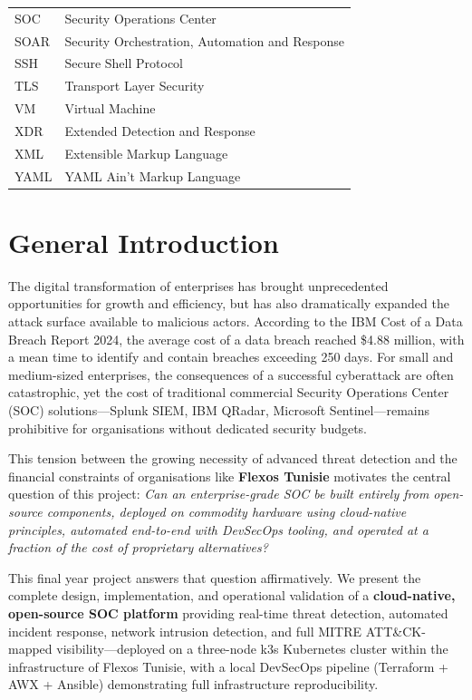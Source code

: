 \documentclass[12pt,a4paper]{report}
\begin{document}
\begin{longtable}{p{3cm}p{10cm}}
SOC    & Security Operations Center \\
SOAR   & Security Orchestration, Automation and Response \\
SSH    & Secure Shell Protocol \\
TLS    & Transport Layer Security \\
VM     & Virtual Machine \\
XDR    & Extended Detection and Response \\
XML    & Extensible Markup Language \\
YAML   & YAML Ain't Markup Language \\
\bottomrule
\end{longtable}

\chapter*{General Introduction}

The digital transformation of enterprises has brought unprecedented opportunities for growth and efficiency, but has also dramatically expanded the attack surface available to malicious actors. According to the IBM Cost of a Data Breach Report 2024, the average cost of a data breach reached \$4.88 million, with a mean time to identify and contain breaches exceeding 250 days. For small and medium-sized enterprises, the consequences of a successful cyberattack are often catastrophic, yet the cost of traditional commercial Security Operations Center (SOC) solutions---Splunk SIEM, IBM QRadar, Microsoft Sentinel---remains prohibitive for organisations without dedicated security budgets.

This tension between the growing necessity of advanced threat detection and the financial constraints of organisations like \textbf{Flexos Tunisie} motivates the central question of this project: \textit{Can an enterprise-grade SOC be built entirely from open-source components, deployed on commodity hardware using cloud-native principles, automated end-to-end with DevSecOps tooling, and operated at a fraction of the cost of proprietary alternatives?}

This final year project answers that question affirmatively. We present the complete design, implementation, and operational validation of a \textbf{cloud-native, open-source SOC platform} providing real-time threat detection, automated incident response, network intrusion detection, and full MITRE ATT\&CK-mapped visibility---deployed on a three-node k3s Kubernetes cluster within the infrastructure of Flexos Tunisie, with a local DevSecOps pipeline (Terraform + AWX + Ansible) demonstrating full infrastructure reproducibility.
\end{document}
